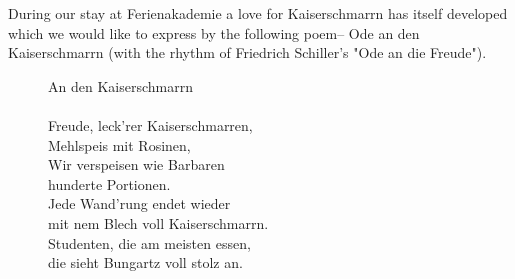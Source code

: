 During our stay at Ferienakademie a love for Kaiserschmarrn has itself developed which we would like to express by the following poem-- Ode an den Kaiserschmarrn (with the rhythm of Friedrich Schiller's "Ode an die Freude"). 
\begin{figure}[ht]
\begin{framed}
An den Kaiserschmarrn 
\\
\\
Freude, leck'rer Kaiserschmarren,\\
Mehlspeis mit Rosinen,\\
Wir verspeisen wie Barbaren \\
hunderte Portionen.\\

Jede Wand'rung endet wieder \\
mit nem Blech voll Kaiserschmarrn.\\
Studenten, die am meisten essen,\\
die sieht Bungartz voll stolz an.
\end{framed}
\end{figure}
\vfill
